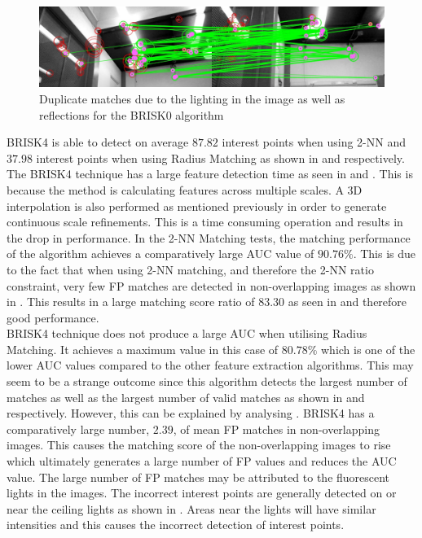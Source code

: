 \documentclass{report}
\begin{document}
\begin{figure}
  \centering
    \includegraphics[width=1.0\textwidth]{../Drawings/problems/Reflections.jpg}
    \caption{Duplicate matches due to the lighting in the image as well as reflections for the BRISK0 algorithm} 
    \label{fig:duplicateMatchesBrisk0}
\end{figure}

BRISK4 is able to detect on average $87.82$ interest points when using 2-NN and $37.98$ interest points when using Radius Matching as shown in  and  respectively. The BRISK4 technique has a large feature detection time as seen in  and . This is because the method is calculating features across multiple scales. A 3D interpolation is also performed as mentioned previously in order to generate continuous scale refinements. This is a time consuming operation and results in the drop in performance. In the 2-NN Matching tests, the matching performance of the algorithm achieves a comparatively large AUC value of $90.76\%$. This is due to the fact that when using 2-NN matching, and therefore the 2-NN ratio constraint, very few FP matches are detected in non-overlapping images as shown in . This results in a large matching score ratio of $83.30$ as seen in  and therefore good performance.\\ 

BRISK4 technique does not produce a large AUC when utilising Radius Matching. It achieves a maximum value in this case of $80.78\%$ which is one of the lower AUC values compared to the other feature extraction algorithms. This may seem to be a strange outcome since this algorithm detects the largest number of matches as well as the largest number of valid matches as shown in  and  respectively. However, this can be explained by analysing . BRISK4 has a comparatively large number, $2.39$, of mean FP matches in non-overlapping images. This causes the matching score of the non-overlapping images to rise which ultimately generates a large number of FP values and reduces the AUC value. The large number of FP matches may be attributed to the fluorescent lights in the images. The incorrect interest points are generally detected on or near the ceiling lights as shown in . Areas near the lights will have similar intensities and this causes the incorrect detection of interest points.\\
\end{document}

